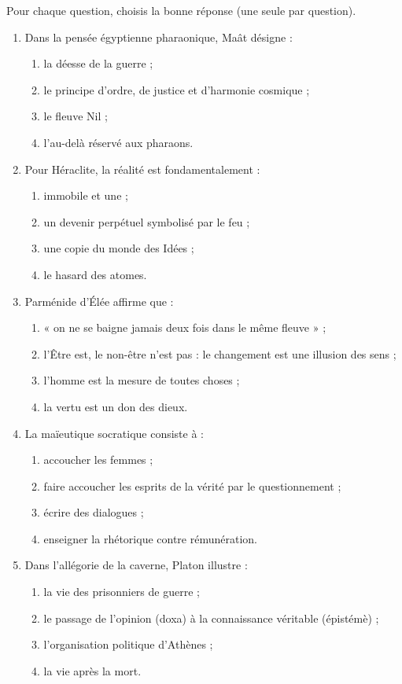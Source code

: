 \documentclass[11pt]{article}
\newcommand{\cle}[1]{{\popxbold\color{popdark}#1}}
\begin{document}
\begin{exercice}
Pour chaque question, choisis la bonne réponse (une seule par question).
\begin{enumerate}
\item Dans la pensée égyptienne pharaonique, \cle{Maât} désigne :
\begin{enumerate}
\item la déesse de la guerre ;
\item le principe d'ordre, de justice et d'harmonie cosmique ;
\item le fleuve Nil ;
\item l'au-delà réservé aux pharaons.
\end{enumerate}
\item Pour Héraclite, la réalité est fondamentalement :
\begin{enumerate}
\item immobile et une ;
\item un devenir perpétuel symbolisé par le feu ;
\item une copie du monde des Idées ;
\item le hasard des atomes.
\end{enumerate}
\item Parménide d'Élée affirme que :
\begin{enumerate}
\item « on ne se baigne jamais deux fois dans le même fleuve » ;
\item l'Être est, le non-être n'est pas : le changement est une illusion des sens ;
\item l'homme est la mesure de toutes choses ;
\item la vertu est un don des dieux.
\end{enumerate}
\item La \cle{maïeutique} socratique consiste à :
\begin{enumerate}
\item accoucher les femmes ;
\item faire accoucher les esprits de la vérité par le questionnement ;
\item écrire des dialogues ;
\item enseigner la rhétorique contre rémunération.
\end{enumerate}
\item Dans l'allégorie de la caverne, Platon illustre :
\begin{enumerate}
\item la vie des prisonniers de guerre ;
\item le passage de l'opinion (\cle{doxa}) à la connaissance véritable (\cle{épistémè}) ;
\item l'organisation politique d'Athènes ;
\item la vie après la mort.
\end{enumerate}
\end{enumerate}
\end{exercice}
\end{document}

